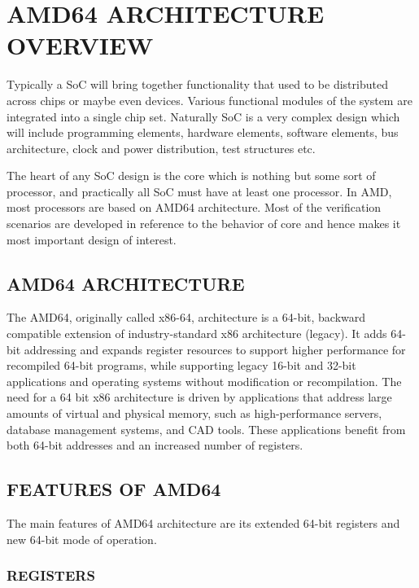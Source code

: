 \chapter{AMD64 ARCHITECTURE OVERVIEW}
\label{chap:amd64}
Typically a SoC will bring together functionality that used to be distributed across chips or maybe even devices. Various functional modules of the system are integrated into a single chip set. Naturally SoC is a very complex design which will include programming elements, hardware elements, software elements, bus architecture, clock and power distribution, test structures etc. 

The heart of any SoC design is the core which is nothing but some sort of processor, and practically all SoC must have at least one processor.  In AMD, most processors are based on AMD64 architecture.  Most of the verification scenarios are developed in reference to the behavior of core and hence makes it most important design of interest.

\section {AMD64 ARCHITECTURE}
The AMD64, originally called x86-64, architecture is a 64-bit, backward compatible extension of industry-standard x86 architecture (legacy)\cite{SS:AMD64-V1}. It adds 64-bit addressing and expands register resources to support higher performance for recompiled 64-bit programs, while supporting legacy 16-bit and 32-bit applications and operating systems without modification or recompilation. The need for a 64 bit x86 architecture is driven by applications that address large amounts of virtual and physical memory, such as high-performance servers, database management systems, and CAD tools. These applications benefit from both 64-bit addresses and an increased number of registers.



\section {FEATURES OF AMD64}
The main features of AMD64 architecture are its extended 64-bit registers and new 64-bit mode of operation.  
\subsection{REGISTERS}

